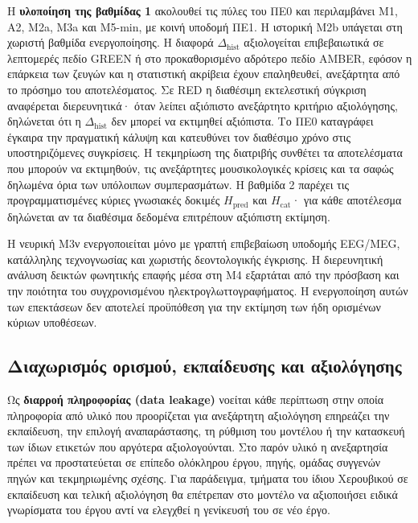 \documentclass[11pt,a4paper]{article}
\begin{document}
Η \textbf{υλοποίηση της βαθμίδας 1} ακολουθεί τις πύλες του ΠΕ0 και περιλαμβάνει Μ1, Α2, Μ2a, Μ3a και Μ5-min, με κοινή υποδομή ΠΕ1. Η ιστορική Μ2b υπάγεται στη χωριστή βαθμίδα ενεργοποίησης. Η διαφορά $\Delta_{\mathrm{hist}}$ αξιολογείται επιβεβαιωτικά σε λεπτομερές πεδίο GREEN ή στο προκαθορισμένο αδρότερο πεδίο AMBER, εφόσον η επάρκεια των ζευγών και η στατιστική ακρίβεια έχουν επαληθευθεί, ανεξάρτητα από το πρόσημο του αποτελέσματος. Σε RED η διαθέσιμη εκτελεστική σύγκριση αναφέρεται διερευνητικά· όταν λείπει αξιόπιστο ανεξάρτητο κριτήριο αξιολόγησης, δηλώνεται ότι η $\Delta_{\mathrm{hist}}$ δεν μπορεί να εκτιμηθεί αξιόπιστα. Το ΠΕ0 καταγράφει έγκαιρα την πραγματική κάλυψη και κατευθύνει τον διαθέσιμο χρόνο στις υποστηριζόμενες συγκρίσεις. Η τεκμηρίωση της διατριβής συνθέτει τα αποτελέσματα που μπορούν να εκτιμηθούν, τις ανεξάρτητες μουσικολογικές κρίσεις και τα σαφώς δηλωμένα όρια των υπόλοιπων συμπερασμάτων. Η βαθμίδα 2 παρέχει τις προγραμματισμένες κύριες γνωσιακές δοκιμές $H_{\mathrm{pred}}$ και $H_{\mathrm{cat}}$· για κάθε αποτέλεσμα δηλώνεται αν τα διαθέσιμα δεδομένα επιτρέπουν αξιόπιστη εκτίμηση.

Η νευρική M3ν ενεργοποιείται μόνο με γραπτή επιβεβαίωση υποδομής EEG/MEG, κατάλληλης τεχνογνωσίας και χωριστής δεοντολογικής έγκρισης. Η διερευνητική ανάλυση δεικτών φωνητικής επαφής μέσα στη M4 εξαρτάται από την πρόσβαση και την ποιότητα του συγχρονισμένου ηλεκτρογλωττογραφήματος. Η ενεργοποίηση αυτών των επεκτάσεων δεν αποτελεί προϋπόθεση για την εκτίμηση των ήδη ορισμένων κύριων υποθέσεων.



\subsection{Διαχωρισμός ορισμού, εκπαίδευσης και αξιολόγησης}

Ως \textbf{διαρροή πληροφορίας (data leakage)} νοείται κάθε περίπτωση στην οποία πληροφορία από υλικό που προορίζεται για ανεξάρτητη αξιολόγηση επηρεάζει την εκπαίδευση, την επιλογή αναπαράστασης, τη ρύθμιση του μοντέλου ή την κατασκευή των ίδιων ετικετών που αργότερα αξιολογούνται. Στο παρόν υλικό η ανεξαρτησία πρέπει να προστατεύεται σε επίπεδο ολόκληρου έργου, πηγής, ομάδας συγγενών πηγών και τεκμηριωμένης σχέσης. Για παράδειγμα, τμήματα του ίδιου Χερουβικού σε εκπαίδευση και τελική αξιολόγηση θα επέτρεπαν στο μοντέλο να αξιοποιήσει ειδικά γνωρίσματα του έργου αντί να ελεγχθεί η γενίκευσή του σε νέο έργο.
\end{document}

